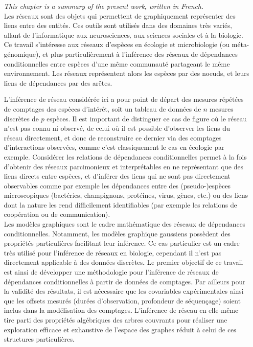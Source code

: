 \textit{This chapter is a summary of the present work, written in French.}\\

Les réseaux sont des objets qui permettent de graphiquement représenter des liens entre des entités.  Ces outils sont utilisés dans des domaines très variés, allant de l'informatique aux neurosciences, aux sciences sociales et à la biologie. Ce travail s'intéresse aux réseaux d'espèces en écologie et microbiologie (ou méta-génomique), et plus particulièrement à l'inférence des réseaux de dépendances conditionnelles entre espèces d'une même communauté partageant le même environnement. Les réseaux représentent alors les espèces par des noeuds, et leurs liens de dépendances par des arêtes.

 L'inférence de réseau considérée ici a pour point de départ des mesures répétées de comptages des espèces d'intérêt, soit un tableau de données de $n$ mesures discrètes de $p$ espèces. Il est important de distinguer ce cas de figure où le réseau n'est pas connu ni observé, de celui où il est possible d'observer les liens du réseau directement, et donc de reconstruire ce dernier via des comptages d'interactions observées, comme c'est classiquement le cas en écologie par exemple. Considérer les relations de dépendances conditionnelles permet à la fois d'obtenir des réseaux parcimonieux et interprétables en ne représentant que des liens directs entre espèces, et d'inférer des liens qui ne sont pas directement observables comme par exemple les dépendances entre des (pseudo-)espèces microscopiques (bactéries, champignons, protéines, virus, gènes, etc.) ou des liens dont la nature les rend difficilement identifiables (par exemple les relations de coopération ou de communication). \\

Les modèles graphiques sont le cadre mathématique des réseaux de dépendances conditionnelles.  Notamment, les modèles graphique gaussiens possèdent des propriétés particulières facilitant leur inférence. Ce cas particulier est un cadre très utilisé pour l'inférence de réseaux en biologie, cependant il n'est pas directement applicable à des données discrètes.  Le premier objectif de ce travail est ainsi de développer une méthodologie pour l'inférence de réseaux de dépendances conditionnelles à partir de données de comptages. Par ailleurs pour la validité des résultats, il est nécessaire que les covariables expérimentales ainsi que les offsets mesurés (durées d'observation, profondeur de séquençage) soient inclus dans la modélisation des comptages. L'inférence de réseau en elle-même tire parti des propriétés algébriques des arbres couvrants pour réaliser une exploration efficace et exhaustive de l'espace des graphes réduit à celui de ces structures particulières.


